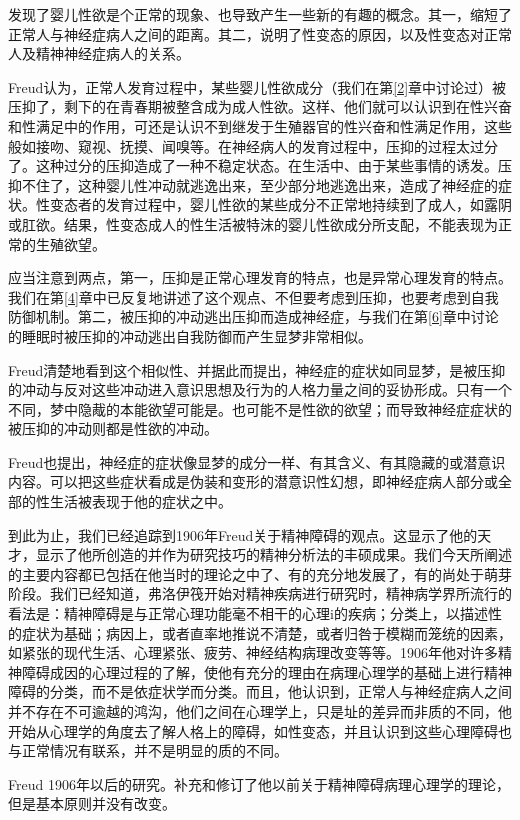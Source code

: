 \documentclass[UTF8,10pt,a4paper,openany]{book}
\begin{document}
发现了婴儿性欲是个正常的现象、也导致产生一些新的有趣的概念。其一，缩短了正常人与神经症病人之间的距离。其二，说明了性变态的原因，以及性变态对正常人及精神神经症病人的关系。

Freud认为，正常人发育过程中，某些婴儿性欲成分（我们在第\ref{2}章中讨论过）被压抑了，剩下的在青春期被整含成为成人性欲。这样、他们就可以认识到在性兴奋和性满足中的作用，可还是认识不到继发于生殖器官的性兴奋和性满足作用，这些般如接吻、窥视、抚摸、闻嗅等。在神经病人的发育过程中，压抑的过程太过分了。这种过分的压抑造成了一种不稳定状态。在生活中、由于某些事情的诱发。压抑不住了，这种婴儿性冲动就逃逸出来，至少部分地逃逸出来，造成了神经症的症状。性变态者的发育过程中，婴儿性欲的某些成分不正常地持续到了成人，如露阴或肛欲。结果，性变态成人的性生活被特沫的婴儿性欲成分所支配，不能表现为正常的生殖欲望。

应当注意到两点，第一，压抑是正常心理发育的特点，也是异常心理发育的特点。我们在第\ref{4}章中已反复地讲述了这个观点、不但要考虑到压抑，也要考虑到自我防御机制。第二，被压抑的冲动逃出压抑而造成神经症，与我们在第\ref{6}章中讨论的睡眠时被压抑的冲动逃出自我防御而产生显梦非常相似。

Freud清楚地看到这个相似性、并据此而提出，神经症的症状如同显梦，是被压抑的冲动与反对这些冲动进入意识思想及行为的人格力量之间的妥协形成。只有一个不同，梦中隐胾的本能欲望可能是。也可能不是性欲的欲望；而导致神经症症状的被压抑的冲动则都是性欲的冲动。

Freud也提出，神经症的症状像显梦的成分一样、有其含义、有其隐藏的或潜意识内容。可以把这些症状看成是伪装和变形的潜意识性幻想，即神经症病人部分或全部的性生活被表现于他的症状之中。

到此为止，我们已经追踪到1906年Freud关于精神障碍的观点。这显示了他的天才，显示了他所创造的并作为研究技巧的精神分析法的丰硕成果。我们今天所阐述的主要内容都已包括在他当时的理论之中了、有的充分地发展了，有的尚处于萌芽阶段。我们已经知道，弗洛伊筏开始对精神疾病进行研究时，精神病学界所流行的看法是：精神障碍是与正常心理功能毫不相干的心理i的疾病；分类上，以描述性的症状为基础；病因上，或者直率地推说不清楚，或者归咎于模糊而笼统的因素，如紧张的现代生活、心理紧张、疲劳、神经结构病理改变等等。1906年他对许多精神障碍成因的心理过程的了解，使他有充分的理由在病理心理学的基础上进行精神障碍的分类，而不是依症状学而分类。而且，他认识到，正常人与神经症病人之间并不存在不可逾越的鸿沟，他们之间在心理学上，只是址的差异而非质的不同，他开始从心理学的角度去了解人格上的障碍，如性变态，并且认识到这些心理障碍也与正常情况有联系，并不是明显的质的不同。

Freud 1906年以后的研究。补充和修订了他以前关于精神障碍病理心理学的理论，但是基本原则并没有改变。
\end{document}

